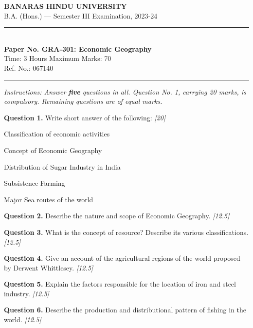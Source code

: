 \documentclass[11pt,a4paper]{article}
\newcommand{\pts}[1]{\hfill   \textit{[#1]}}
\begin{document}
\begin{center}
  {\large\bfseries BANARAS HINDU UNIVERSITY}\\[2pt]
  {\normalsize B.A. (Hons.) --- Semester III Examination, 2023-24}\\[6pt]
  \rule{0.8\linewidth}{0.5pt}\\[6pt]
  {\large\bfseries Paper No. GRA-301: Economic Geography}\\[4pt]
  {\normalsize Time: 3 Hours \hfill Maximum Marks: 70}\\[2pt]
  {\small Ref. No.: 067140}
\end{center}
\rule{\linewidth}{0.4pt}
\smallskip



\noindent   \textit{Instructions: Answer   \textbf{five} questions in all. Question No. 1, carrying 20 marks, is compulsory. Remaining questions are of equal marks.}
\bigskip




\noindent   \textbf{Question 1.} Write short answer of the following: \pts{20}

\begin{parts}
  \item Classification of economic activities
  \item Concept of Economic Geography
  \item Distribution of Sugar Industry in India
  \item Subsistence Farming
  \item Major Sea routes of the world
\end{parts}

\medskip


\noindent   \textbf{Question 2.} Describe the nature and scope of Economic Geography. \pts{12.5}

\medskip


\noindent   \textbf{Question 3.} What is the concept of resource? Describe its various classifications. \pts{12.5}

\medskip


\noindent   \textbf{Question 4.} Give an account of the agricultural regions of the world proposed by Derwent Whittlesey. \pts{12.5}

\medskip


\noindent   \textbf{Question 5.} Explain the factors responsible for the location of iron and steel industry. \pts{12.5}

\medskip


\noindent   \textbf{Question 6.} Describe the production and distributional pattern of fishing in the world. \pts{12.5}
\end{document}
